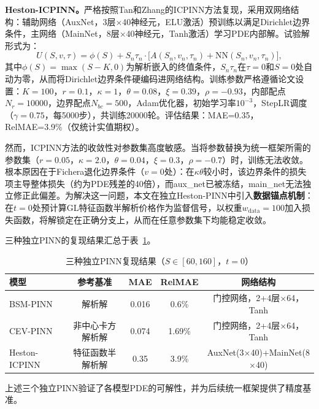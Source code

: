 \textbf{Heston-ICPINN。}严格按照Tan和Zhang\cite{guo2024icpinn}的ICPINN方法复现，采用双网络结构：辅助网络（AuxNet，3层$\times$40神经元，ELU激活）预训练以满足Dirichlet边界条件，主网络（MainNet，8层$\times$40神经元，Tanh激活）学习PDE内部解。试验解形式为：
\begin{equation}\label{eq:icpinn_trial}
  U(S,v,\tau) = \phi(S) + S_n\tau_n \cdot \bigl[A(S_n,v_n,\tau_n) + \mathrm{NN}(S_n,v_n,\tau_n)\bigr],
\end{equation}
其中$\phi(S)=\max(S-K,0)$为解析嵌入的终值条件，$S_n\tau_n$在$\tau=0$和$S=0$处自动为零，从而将Dirichlet边界条件硬编码进网络结构。训练参数严格遵循论文设置：$K=100$，$r=0.1$，$\kappa=1$，$\theta=0.08$，$\xi=0.39$，$\rho=-0.93$，内部配点$N_r=10000$，边界配点$N_{bc}=500$，Adam优化器，初始学习率$10^{-3}$，StepLR调度（$\gamma=0.75$，每5000步），共训练20000轮。评估结果：MAE=0.35，RelMAE=3.9\%（仅统计实值期权）。

然而，ICPINN方法的收敛性对参数集高度敏感。当将参数替换为统一框架所需的参数集（$r=0.05$，$\kappa=2.0$，$\theta=0.04$，$\xi=0.3$，$\rho=-0.7$）时，训练无法收敛。根本原因在于Fichera退化边界条件（$v=0$处）：在$\kappa\theta$较小时，该边界条件的损失项主导整体损失（约为PDE残差的40倍），而aux\_net已被冻结，main\_net无法独立修正此偏差。为解决这一问题，本文在独立Heston-PINN中引入\textbf{数据锚点机制}：在$t=0$处预计算GL特征函数半解析价格作为监督信号，以权重$w_\text{data}=100$加入损失函数，将解锁定在正确分支上，从而在任意参数集下均能稳定收敛。

三种独立PINN的复现结果汇总于表~\ref{tab:reproduction}。

\begin{table}[htbp]
  \centering
  \caption{三种独立PINN复现结果（$S\in[60,160]$，$t=0$）}
  \label{tab:reproduction}
  \begin{tabular}{lcccc}
    \hline
    模型 & 参考基准 & MAE & RelMAE & 网络结构 \\
    \hline
    BSM-PINN      & 解析解           & 0.016 & 0.6\%  & 门控网络，2+4层$\times$64，Tanh \\
    CEV-PINN      & 非中心卡方解析解 & 0.074 & 1.69\% & 门控网络，2+4层$\times$64，Tanh \\
    Heston-ICPINN & 特征函数半解析解 & 0.35  & 3.9\%  & AuxNet(3$\times$40)+MainNet(8$\times$40) \\
    \hline
  \end{tabular}
\end{table}

上述三个独立PINN验证了各模型PDE的可解性，并为后续统一框架提供了精度基准。


